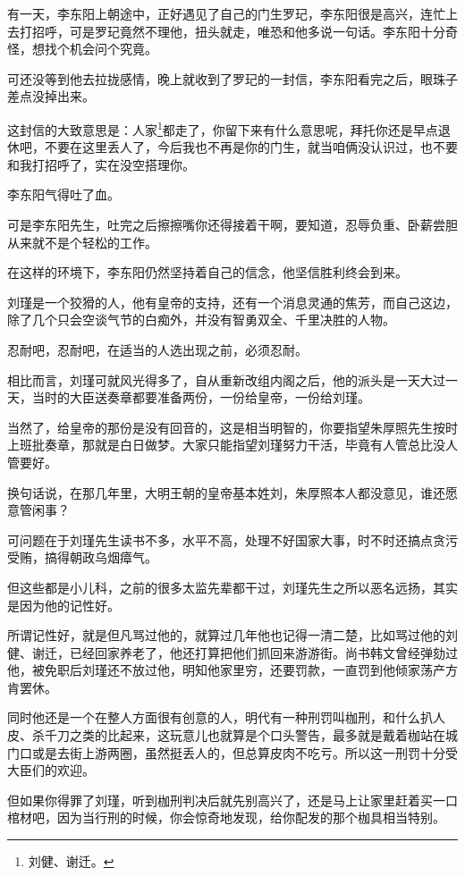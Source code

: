 \begin{multicols}{\theparacolNo}
		有一天，李东阳上朝途中，正好遇见了自己的门生罗玘，李东阳很是高兴，连忙上去打招呼，可是罗玘竟然不理他，扭头就走，唯恐和他多说一句话。李东阳十分奇怪，想找个机会问个究竟。

		可还没等到他去拉拢感情，晚上就收到了罗玘的一封信，李东阳看完之后，眼珠子差点没掉出来。

		这封信的大致意思是：人家\footnote{刘健、谢迁。}都走了，你留下来有什么意思呢，拜托你还是早点退休吧，不要在这里丢人了，今后我也不再是你的门生，就当咱俩没认识过，也不要和我打招呼了，实在没空搭理你。

		李东阳气得吐了血。

		可是李东阳先生，吐完之后擦擦嘴你还得接着干啊，要知道，忍辱负重、卧薪尝胆从来就不是个轻松的工作。

		在这样的环境下，李东阳仍然坚持着自己的信念，他坚信胜利终会到来。

		刘瑾是一个狡猾的人，他有皇帝的支持，还有一个消息灵通的焦芳，而自己这边，除了几个只会空谈气节的白痴外，并没有智勇双全、千里决胜的人物。

		忍耐吧，忍耐吧，在适当的人选出现之前，必须忍耐。

		相比而言，刘瑾可就风光得多了，自从重新改组内阁之后，他的派头是一天大过一天，当时的大臣送奏章都要准备两份，一份给皇帝，一份给刘瑾。

		当然了，给皇帝的那份是没有回音的，这是相当明智的，你要指望朱厚照先生按时上班批奏章，那就是白日做梦。大家只能指望刘瑾努力干活，毕竟有人管总比没人管要好。

		换句话说，在那几年里，大明王朝的皇帝基本姓刘，朱厚照本人都没意见，谁还愿意管闲事？

		可问题在于刘瑾先生读书不多，水平不高，处理不好国家大事，时不时还搞点贪污受贿，搞得朝政乌烟瘴气。

		但这些都是小儿科，之前的很多太监先辈都干过，刘瑾先生之所以恶名远扬，其实是因为他的记性好。

		所谓记性好，就是但凡骂过他的，就算过几年他也记得一清二楚，比如骂过他的刘健、谢迁，已经回家养老了，他还打算把他们抓回来游游街。尚书韩文曾经弹劾过他，被免职后刘瑾还不放过他，明知他家里穷，还要罚款，一直罚到他倾家荡产方肯罢休。

		同时他还是一个在整人方面很有创意的人，明代有一种刑罚叫枷刑，和什么扒人皮、杀千刀之类的比起来，这玩意儿也就算是个口头警告，最多就是戴着枷站在城门口或是去街上游两圈，虽然挺丢人的，但总算皮肉不吃亏。所以这一刑罚十分受大臣们的欢迎。

		但如果你得罪了刘瑾，听到枷刑判决后就先别高兴了，还是马上让家里赶着买一口棺材吧，因为当行刑的时候，你会惊奇地发现，给你配发的那个枷具相当特别。


\end{multicols}
